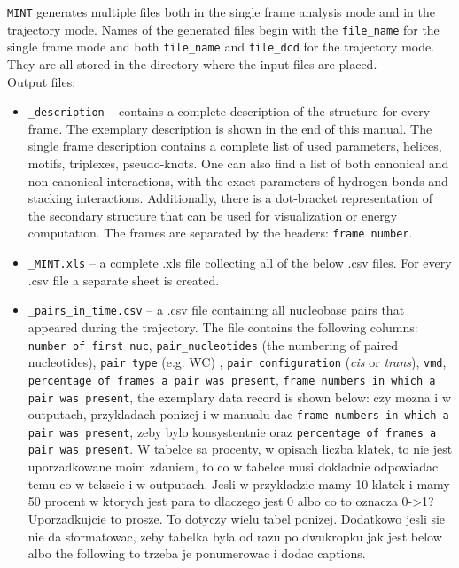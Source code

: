 \documentclass[12pt]{article}
\begin{document}
{\tt MINT} generates multiple files both in the single frame analysis mode and in the trajectory mode. Names of the generated files begin with the \texttt{file\_name} for the single frame mode and both \texttt{file\_name} and \texttt{file\_dcd} for the trajectory mode. They are all stored in the directory where the input files are placed.\\

\noindent
Output files:
\begin{itemize}
\item \texttt{\_description} -- contains a complete description of the structure for every frame. The exemplary description is shown in the end of this manual. The single frame description contains a complete list of used parameters, helices, motifs, triplexes, pseudo-knots. One can also find a list of both canonical and non-canonical interactions, with the exact parameters of hydrogen bonds and stacking interactions. Additionally, there is a  dot-bracket representation of the secondary structure that can be used for visualization or energy computation. The frames are separated by the headers: \texttt{frame number}.

\item \texttt{\_MINT.xls} -- a complete .xls file collecting all of the below .csv files. For every .csv file a separate sheet is created. 

\item \texttt{\_pairs\_in\_time.csv} --  a .csv file containing all nucleobase pairs that appeared during the trajectory. The file contains the following columns: \texttt{number of first nuc}, 	\texttt{pair\_nucleotides} (the numbering of paired nucleotides), \texttt{pair type} (e.g. WC) , \texttt{pair configuration} (\textit{cis} or \textit{trans}), \texttt{vmd}, \texttt{percentage of frames a pair was present}, \texttt{frame numbers in which a pair was present}, the exemplary data record is shown below:
{\color{red} czy mozna i w outputach, przykladach ponizej i w manualu dac \texttt{frame numbers in which a pair was present}, zeby bylo konsystentnie oraz \texttt{percentage of frames a pair was present}. W tabelce sa procenty, w opisach liczba klatek, to nie jest uporzadkowane moim zdaniem, to co w tabelce musi dokladnie odpowiadac temu co w tekscie i w outputach. Jesli w przykladzie mamy 10 klatek i mamy 50 procent w ktorych jest para to dlaczego jest 0 albo co to oznacza 0->1? Uporzadkujcie to prosze. To dotyczy wielu tabel ponizej. Dodatkowo jesli sie nie da sformatowac, zeby tabelka byla od razu po dwukropku jak jest below albo the following to trzeba je ponumerowac i dodac captions.}


\end{itemize}
\end{document}

